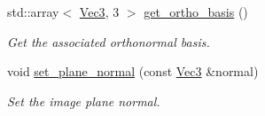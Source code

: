 \begin{DoxyCompactItemize}
std\+::array$<$ \mbox{\hyperlink{namespaceomg_acf927839a305877d454c507f0b96730b}{Vec3}}, 3 $>$ \mbox{\hyperlink{classomg_1_1_camera_a7bc7168312ae9923904489e792ad0526}{get\+\_\+ortho\+\_\+basis}} ()
\begin{DoxyCompactList}\small\item\em Get the associated orthonormal basis. \end{DoxyCompactList}\item 
void \mbox{\hyperlink{classomg_1_1_camera_a5983a689364dd5c9701e157b4620c2cd}{set\+\_\+plane\+\_\+normal}} (const \mbox{\hyperlink{namespaceomg_acf927839a305877d454c507f0b96730b}{Vec3}} \&normal)
\begin{DoxyCompactList}\small\item\em Set the image plane normal. \end{DoxyCompactList}\end{DoxyCompactItemize}
